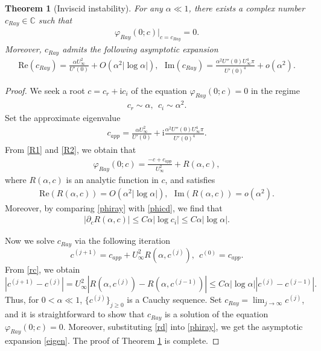 \documentclass[reqno,11pt]{amsart}
\numberwithin{equation}{section}
\numberwithin{equation}{section}
\theoremstyle{plain}
\newtheorem{theorem}{Theorem}[section]
\begin{document}
\begin{theorem}[Inviscid instability]\label{iv}
	For any $\alpha\ll1$, there exists a complex number $c_{Ray}\in \mathbb{C}$ such that
	\begin{align}
		\varphi_{Ray}(0;c)|_{c=c_{Ray}}=0.\nonumber
	\end{align}
Moreover, $c_{Ray}$ admits the following asymptotic expansion
\begin{align}
	\mathrm{Re}(c_{Ray})=\frac{\alpha U_{\infty}^2}{U'(0)}+O(\alpha^2 |\log \alpha|),~~~\mathrm{Im}(c_{Ray})=\frac{\alpha^2U''(0)U_{\infty}^4\pi}{U'(0)^4}+o(\alpha^2).\label{eigen}
\end{align}
\end{theorem}
\begin{proof}
	We seek a root $c=c_r+\mathrm{i}c_i$ of the equation $\varphi_{Ray}(0;c)=0$ in the regime 
	\begin{align}
		c_r\sim \alpha,~~c_i\sim \alpha^2.\nonumber
	\end{align}
Set the approximate eigenvalue
\begin{align}
	c_{app}=\frac{\alpha U_{\infty}^2}{U'(0)}+\mathrm{i}\frac{\alpha^2U''(0)U_{\infty}^4\pi}{U'(0)^4}.\nonumber
\end{align}
From \eqref{R1} and \eqref{R2}, we obtain that
\begin{align}\label{phiray}
	\varphi_{Ray}(0;c)=\frac{-c+c_{app}}{U_{\infty}^2}+R(\alpha,c),
\end{align}
where $R(\alpha,c)$ is an analytic function in $c$, and satisfies
\begin{align}
	\mathrm{Re}\left(R(\alpha,c)\right)=O(\alpha^2|\log\alpha|),~~~\mathrm{Im}\left(R(\alpha,c)\right)=o(\alpha^2).\label{rd}
\end{align}
Moreover, by comparing \eqref{phiray} with \eqref{phicd}, we find that
\begin{align}
|\partial_c R(\alpha,c)|\leq C\alpha |\log c_i|\leq C\alpha |\log \alpha|.\label{rc}
\end{align}

Now we solve $c_{Ray}$ via the following iteration
$$c^{(j+1)}=c_{app}+U_{\infty}^2R(\alpha,c^{(j)}),~~c^{(0)}=c_{app}.
$$
From \eqref{rc}, we obtain
$$|c^{(j+1)}-c^{(j)}|=U_{\infty}^2|R(\alpha,c^{(j)})-R(\alpha,c^{(j-1)})|\leq C\alpha|\log \alpha||c^{(j)}-c^{(j-1)}|.
$$
Thus, for $0<\alpha\ll 1$, $\{c^{(j)}\}_{j\geq 0}$ is a Cauchy sequence. Set $c_{Ray}=\lim_{j\rightarrow\infty}c^{(j)}$, and it is straightforward to show that $c_{Ray}$ is a solution of the equation $\varphi_{Ray}(0;c)=0$. Moreover, substituting \eqref{rd} into \eqref{phiray}, we get the asymptotic expansion \eqref{eigen}. The proof of Theorem \ref{iv} is complete.
\end{proof}
\end{document}
